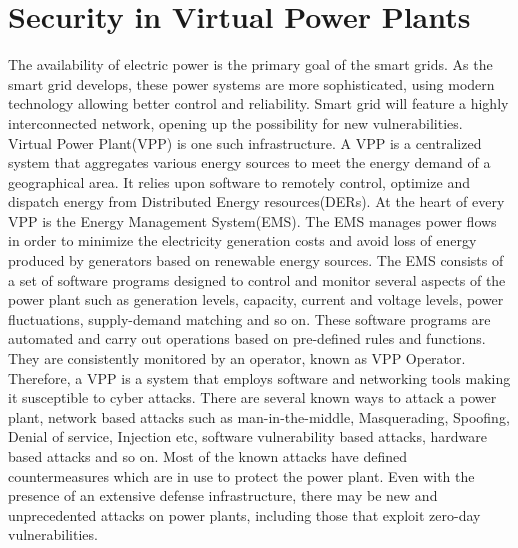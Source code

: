 \section{Security in Virtual Power Plants}

The availability of electric power is the primary goal of the smart grids. As the smart grid develops, these power systems are more sophisticated, using modern technology allowing better control and reliability. Smart grid will feature a highly interconnected network, opening up the possibility for new vulnerabilities.\\


Virtual Power Plant(VPP) is one such infrastructure. A VPP is a centralized system that aggregates various energy sources to meet the energy demand of a geographical area. It relies upon software to remotely control, optimize and dispatch energy from Distributed Energy resources(DERs). At the heart of every VPP is the Energy Management System(EMS). The EMS manages power flows in order to minimize the electricity generation costs and avoid loss of energy produced by generators based on renewable energy sources. The EMS consists of a set of software programs designed to control and monitor several aspects of the power plant such as generation levels, capacity, current and voltage levels, power fluctuations, supply-demand matching and so on. These software programs are automated and carry out operations based on pre-defined rules and functions. They are consistently monitored by an operator, known as VPP Operator. Therefore, a VPP is a system that employs software and networking tools making it susceptible to cyber attacks. There are several known ways to attack a power plant, network based attacks such as man-in-the-middle, Masquerading, Spoofing, Denial of service, Injection etc, software vulnerability based attacks, hardware based attacks and so on. Most of the known attacks have defined countermeasures which are in use to protect the power plant. Even with the presence of an extensive defense infrastructure, there may be new and unprecedented attacks on power plants, including those that exploit zero-day vulnerabilities. 
\newline
